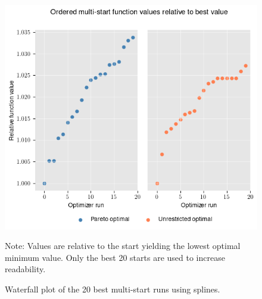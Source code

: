 \begin{figure}[h!]
\centering
\includegraphics[scale=0.53]{images/splines_waterfall.png}\\
\begin{flushleft}
\scriptsize{Note:} Values are relative to the start yielding the lowest optimal minimum value. Only the best 20 starts are used to increase readability. 
\end{flushleft}
\caption{Waterfall plot of the 20 best multi-start runs using splines.}
\label{fig:results_splines_waterfall}
\end{figure}

\clearpage
